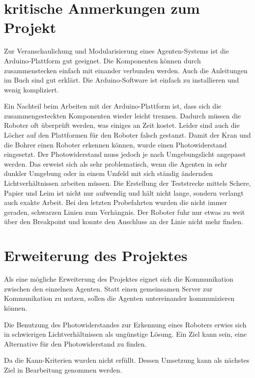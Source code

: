\section{kritische Anmerkungen zum Projekt}

Zur Veranschaulichung und Modularisierung eines Agenten-Systems ist die Arduino-Plattform gut geeignet. Die Komponenten können durch zusammenstecken einfach mit einander verbunden werden. Auch die Anleitungen im Buch sind gut erklärt. Die Arduino-Software ist einfach zu installieren und wenig kompliziert. 

Ein Nachteil beim Arbeiten mit der Arduino-Plattform ist, dass sich die zusammengesteckten Komponenten wieder leicht trennen. Dadurch müssen die Roboter oft überprüft werden, was einiges an Zeit kostet. Leider sind auch die Löcher auf den Plattformen für den Roboter falsch gestanzt. Damit der Kran und die Bohrer einen Roboter erkennen können, wurde einen Photowiderstand eingesetzt. Der Photowiderstand muss jedoch je nach Umgebungslicht angepasst werden. Das erweist sich als sehr problematisch, wenn die Agenten in sehr dunkler Umgebung oder in einem Umfeld mit sich ständig ändernden Lichtverhältnissen arbeiten müssen. Die Erstellung der Teststrecke mittels Schere, Papier und Leim ist nicht nur aufwendig und hält nicht lange, sondern verlangt auch exakte Arbeit. Bei den letzten Probefahrten wurden die nicht immer geraden, schwarzen Linien zum Verhängnis. Der Roboter fuhr nur etwas zu weit über den Breakpoint und konnte den Anschluss an der Linie nicht mehr finden.  

\section{Erweiterung des Projektes}

Als eine mögliche Erweiterung des Projektes eignet sich die Kommunikation zwischen den einzelnen Agenten. Statt einen gemeinsamen Server zur Kommunikation zu nutzen, sollen die Agenten untereinander kommunizieren können. 

Die Benutzung des Photowiderstandes zur Erkennung eines Roboters erwies sich in schwierigen Lichtverhältnissen als ungünstige Lösung. Ein Ziel kann sein, eine Alternative für den Photowiderstand zu finden.

Da die Kann-Kriterien wurden nicht erfüllt. Dessen Umsetzung kann als nächstes Ziel in Bearbeitung genommen werden.    